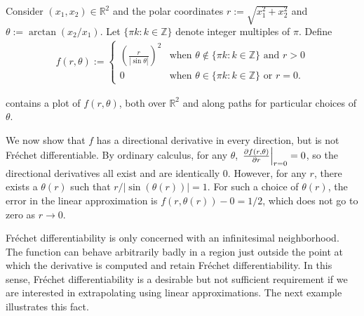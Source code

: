 \begin{ex}
%
Consider $(x_1, x_2) \in \mathbb{R}^2$ and the polar coordinates $r :=
\sqrt{x_1^2 + x_2^2}$ and $\theta := \arctan(x_2 / x_1)$.  Let $\{\pi k: k \in
\mathbb{Z} \}$ denote integer multiples of $\pi$.  Define
%
\begin{align*}
%
f(r, \theta) := \begin{cases}
    \left(\frac{r}{| \sin \theta |}\right)^2
        & \textrm{when } \theta \notin \{\pi k: k \in \mathbb{Z}\}
        \textrm{ and } r > 0 \\
    0 & \textrm{when } \theta \in \{\pi k: k \in \mathbb{Z}
        \} \textrm{ or }r = 0.
%
\end{cases}
%
\end{align*}
%
\SimPathologicalRTwoFig{}

%
%
 contains a plot of $f(r, \theta)$, both over
$\mathbb{R}^2$ and along paths for particular choices of $\theta$.

We now show that $f$ has a directional derivative in every direction, but is not
Fr{\'e}chet differentiable.  By ordinary calculus, for any $\theta$,
$\left.\frac{\partial f(r, \theta)}{\partial r}\right\vert_{r=0} = 0$, so the directional
derivatives all exist and are identically $0$.  However, for any $r$, there
exists a $\theta(r)$ such that $r / |\sin(\theta(r))| = 1$.  For such a choice
of $\theta(r)$, the error in the linear approximation is $f(r, \theta(r)) - 0 =
1/2$, which does not go to zero as $r \rightarrow 0$.

\end{ex}

Fr{\'e}chet differentiability is only concerned with an infinitesimal
neighborhood.  The function can behave arbitrarily badly in a region just
outside the point at which the derivative is computed and retain Fr{\'e}chet
differentiability. In this sense, Fr{\'e}chet differentiability is a desirable
but not sufficient requirement if we are interested in extrapolating using
linear approximations.  The next example illustrates this fact.

